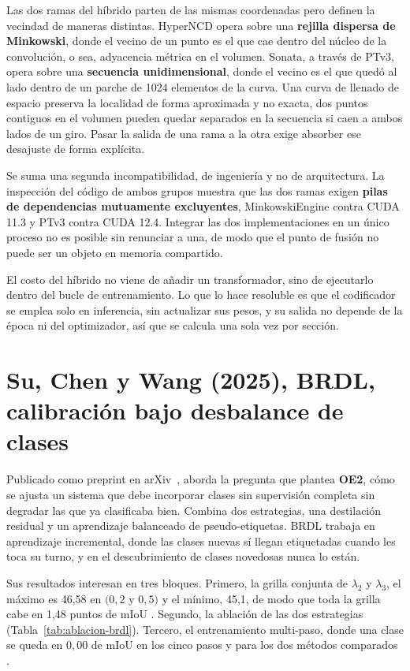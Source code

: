 Las dos ramas del híbrido parten de las mismas coordenadas pero definen la
vecindad de maneras distintas. HyperNCD opera sobre una \textbf{rejilla dispersa
de Minkowski}, donde el vecino de un punto es el que cae dentro del núcleo de la
convolución, o sea, adyacencia métrica en el volumen. Sonata, a través de PTv3,
opera sobre una \textbf{secuencia unidimensional}, donde el vecino es el que
quedó al lado dentro de un parche de 1024 elementos de la curva. Una curva de
llenado de espacio preserva la localidad de forma aproximada y no exacta, dos
puntos contiguos en el volumen pueden quedar separados en la secuencia si caen a
ambos lados de un giro. Pasar la salida de una rama a la otra exige absorber ese
desajuste de forma explícita.

Se suma una segunda incompatibilidad, de ingeniería y no de arquitectura. La
inspección del código de ambos grupos muestra que las dos ramas exigen
\textbf{pilas de dependencias mutuamente excluyentes}, MinkowskiEngine contra
CUDA 11.3 y PTv3 contra CUDA 12.4. Integrar las dos implementaciones en un único
proceso no es posible sin renunciar a una, de modo que el punto de fusión no puede
ser un objeto en memoria compartido.

El costo del híbrido no viene de añadir un transformador, sino de ejecutarlo
dentro del bucle de entrenamiento. Lo que lo hace resoluble es que el codificador
se emplea solo en inferencia, sin actualizar sus pesos, y su salida no depende de la época ni del
optimizador, así que se calcula una sola vez por sección.

\section[BRDL]{Su, Chen y Wang (2025), BRDL, calibración bajo desbalance de
clases}
\label{sec:brdl}

Publicado como preprint en arXiv~\cite{su2025brdl}, aborda la pregunta que plantea
\textbf{OE2}, cómo se ajusta un sistema que debe incorporar clases sin supervisión
completa sin degradar las que ya clasificaba bien. Combina dos estrategias, una destilación residual y un aprendizaje balanceado de
pseudo-etiquetas. BRDL trabaja en aprendizaje incremental, donde las clases nuevas sí llegan
etiquetadas cuando les toca su turno, y en el descubrimiento de clases novedosas
nunca lo están.

Sus resultados interesan en tres bloques. Primero, la grilla conjunta de
$\lambda_2$ y $\lambda_3$, el máximo es 46,58 en $(0{,}2$ y $0{,}5)$ y el mínimo,
45,1, de modo que toda la grilla cabe en 1,48 puntos de mIoU
\cite[Tabla~4]{su2025brdl}. Segundo, la ablación de las dos estrategias
(Tabla~\ref{tab:ablacion-brdl}). Tercero, el entrenamiento multi-paso, donde una clase se queda en $0{,}00$ de mIoU
en los cinco pasos y para los dos métodos comparados \cite[Tabla~5]{su2025brdl}.

